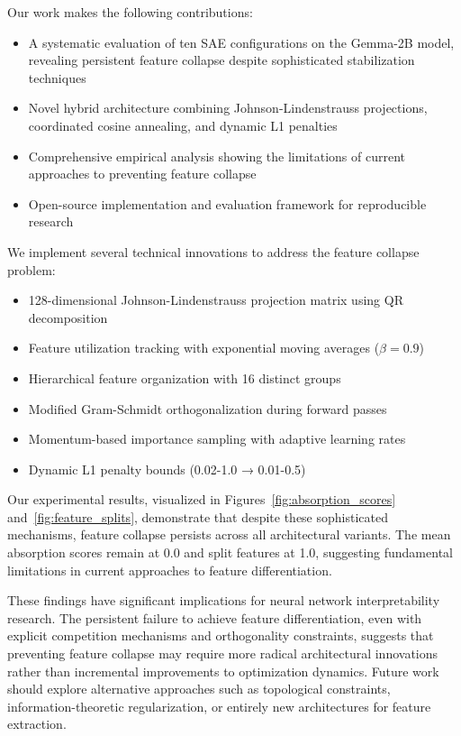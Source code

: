 \documentclass{article} %
\begin{document}
Our work makes the following contributions:
\begin{itemize}
    \item A systematic evaluation of ten SAE configurations on the Gemma-2B model, revealing persistent feature collapse despite sophisticated stabilization techniques
    \item Novel hybrid architecture combining Johnson-Lindenstrauss projections, coordinated cosine annealing, and dynamic L1 penalties
    \item Comprehensive empirical analysis showing the limitations of current approaches to preventing feature collapse
    \item Open-source implementation and evaluation framework for reproducible research
\end{itemize}

We implement several technical innovations to address the feature collapse problem:
\begin{itemize}
    \item 128-dimensional Johnson-Lindenstrauss projection matrix using QR decomposition
    \item Feature utilization tracking with exponential moving averages ($\beta=0.9$)
    \item Hierarchical feature organization with 16 distinct groups
    \item Modified Gram-Schmidt orthogonalization during forward passes
    \item Momentum-based importance sampling with adaptive learning rates
    \item Dynamic L1 penalty bounds (0.02-1.0 → 0.01-0.5)
\end{itemize}

Our experimental results, visualized in Figures~\ref{fig:absorption_scores} and~\ref{fig:feature_splits}, demonstrate that despite these sophisticated mechanisms, feature collapse persists across all architectural variants. The mean absorption scores remain at 0.0 and split features at 1.0, suggesting fundamental limitations in current approaches to feature differentiation.

These findings have significant implications for neural network interpretability research. The persistent failure to achieve feature differentiation, even with explicit competition mechanisms and orthogonality constraints, suggests that preventing feature collapse may require more radical architectural innovations rather than incremental improvements to optimization dynamics. Future work should explore alternative approaches such as topological constraints, information-theoretic regularization, or entirely new architectures for feature extraction.
\end{document}
